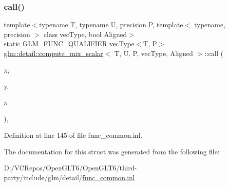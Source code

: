 \subsubsection{\texorpdfstring{call()}{call()}}
{\footnotesize\ttfamily template$<$typename T, typename U, precision P, template$<$ typename, precision $>$ class vec\+Type, bool Aligned$>$ \\
static \mbox{\hyperlink{setup_8hpp_a33fdea6f91c5f834105f7415e2a64407}{G\+L\+M\+\_\+\+F\+U\+N\+C\+\_\+\+Q\+U\+A\+L\+I\+F\+I\+ER}} vec\+Type$<$T, P$>$ \mbox{\hyperlink{structglm_1_1detail_1_1compute__mix__scalar}{glm\+::detail\+::compute\+\_\+mix\+\_\+scalar}}$<$ T, U, P, vec\+Type, Aligned $>$\+::call (\begin{DoxyParamCaption}\item[{vec\+Type$<$ T, P $>$ const \&}]{x,  }\item[{vec\+Type$<$ T, P $>$ const \&}]{y,  }\item[{U const \&}]{a }\end{DoxyParamCaption})\hspace{0.3cm}{\ttfamily [inline]}, {\ttfamily [static]}}



Definition at line 145 of file func\+\_\+common.\+inl.



The documentation for this struct was generated from the following file\+:\begin{DoxyCompactItemize}
\item 
D\+:/\+V\+C\+Repos/\+Open\+G\+L\+T6/\+Open\+G\+L\+T6/third-\/party/include/glm/detail/\mbox{\hyperlink{func__common_8inl}{func\+\_\+common.\+inl}}\end{DoxyCompactItemize}

